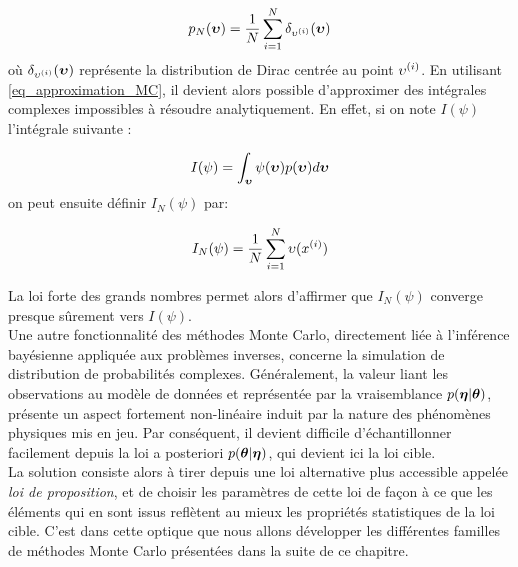 \begin{equation}
p_N({\bm{\upsilon}}) = \dfrac{1}{N} \sum\limits_{i=1}^N\delta_{{\upsilon}^{(i)}}({\bm{\upsilon}})
\label{eq_approximation_MC}
\end{equation}
où $\delta_{{\upsilon}^{(i)}}({\bm{\upsilon}})$ représente la distribution de Dirac centrée au point ${\upsilon}^{(i)}$. En utilisant \eqref{eq_approximation_MC}, il devient alors possible d'approximer des intégrales complexes impossibles à résoudre analytiquement. En effet, si on note $I(\psi)$ l'intégrale suivante : 

\begin{equation}
I(\psi) = \int_{\mathcal{{\bm{\upsilon}}}} \psi({\bm{\upsilon}})p({\bm{\upsilon}})d{\bm{\upsilon}}
\label{eq_integrale_MC_intractable}
\end{equation}
on peut ensuite définir $I_N(\psi)$ par:

\begin{equation}
I_N(\psi) = \dfrac{1}{N} \sum\limits_{i=1}^N {\upsilon}(x^{(i)})
\label{eq_integrale_MC_approximation}
\end{equation}

La loi forte des grands nombres permet alors d'affirmer que $I_N(\psi)$ converge presque sûrement vers $I(\psi)$.\\


Une autre fonctionnalité des méthodes Monte Carlo, directement liée à l'inférence bayésienne appliquée aux problèmes inverses, concerne la simulation de distribution de probabilités complexes. Généralement, la valeur liant les observations au modèle de données et représentée par la vraisemblance $p({\bm{\eta}} |{\bm{\theta}})$, présente un aspect fortement non-linéaire induit par la nature des phénomènes physiques mis en jeu. Par conséquent, il devient difficile d'échantillonner facilement depuis la loi a posteriori ${p({\bm{\theta}} | {\bm{\eta}})}$, qui devient ici la loi cible.\\

La solution consiste alors à tirer depuis une loi alternative plus accessible appelée \textit{loi de proposition}, et de choisir les paramètres de cette loi de façon à ce que les éléments qui en sont issus reflètent au mieux les propriétés statistiques de la loi cible. C'est dans cette optique que nous allons développer les différentes familles de méthodes Monte Carlo présentées dans la suite de ce chapitre.\\


